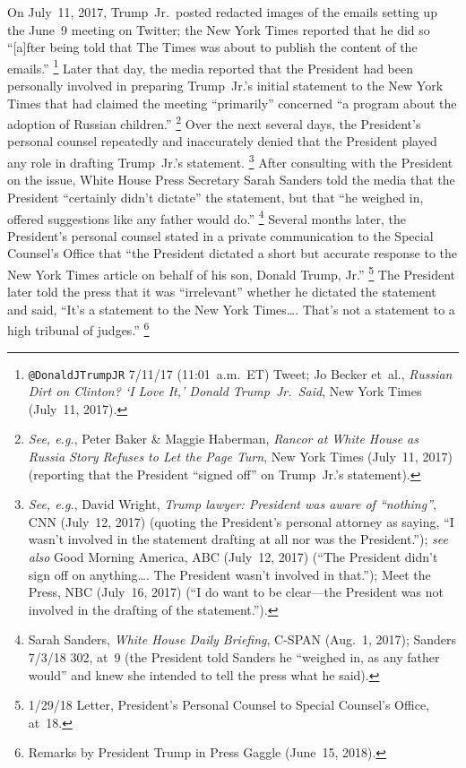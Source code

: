 On July~11, 2017, Trump~Jr.\ posted redacted images of the emails setting up the June~9 meeting on Twitter; the New York Times reported that he did so ``[a]fter being told that The Times was about to publish the content of the emails.''%
\footnote{\verb+@DonaldJTrumpJR+ 7/11/17 (11:01~a.m.~ET) Tweet;
Jo Becker et~al., \textit{Russian Dirt on Clinton? `I Love It,' Donald Trump~Jr.\ Said}, New York Times (July~11, 2017).}
Later that day, the media reported that the President had been personally involved in preparing Trump~Jr.'s initial statement to the New York Times that had claimed the meeting ``primarily'' concerned ``a program about the adoption of Russian children.''%
\footnote{\textit{See, e.g.}, Peter Baker \& Maggie Haberman, \textit{Rancor at White House as Russia Story Refuses to Let the Page Turn}, New York Times (July~11, 2017) (reporting that the President ``signed off\thinspace'' on Trump~Jr.'s statement).}
Over the next several days, the President's personal counsel repeatedly and inaccurately denied that the President played any role in drafting Trump~Jr.'s statement.%
\footnote{\textit{See, e.g.}, David Wright, \textit{Trump lawyer: President was aware of ``nothing''}, CNN (July~12, 2017) (quoting the President's personal attorney as saying, ``I wasn't involved in the statement drafting at all nor was the President.'');
\textit{see also} Good Morning America, ABC (July~12, 2017) (``The President didn't sign off on anything\dots. The President wasn't involved in that.'');
Meet the Press, NBC (July~16, 2017) (``I do want to be clear---the President was not involved in the drafting of the statement.'').}
After consulting with the President on the issue, White House Press Secretary Sarah Sanders told the media that the President ``certainly didn't dictate'' the statement, but that ``he weighed in, offered suggestions like any father would do.''%
\footnote{Sarah Sanders, \textit{White House Daily Briefing}, C-SPAN (Aug.~1, 2017);
Sanders 7/3/18 302, at~9 (the President told Sanders he ``weighed in, as any father would'' and knew she intended to tell the press what he said).}
Several months later, the President's personal counsel stated in a private communication to the Special Counsel's Office that ``the President dictated a short but accurate response to the New York Times article on behalf of his son, Donald Trump, Jr.''%
\footnote{1/29/18 Letter, President's Personal Counsel to Special Counsel's Office, at~18.}
The President later told the press that it was ``irrelevant'' whether he dictated the statement and said, ``It's a statement to the New York Times\dots. That's not a statement to a high tribunal of judges.''%
\footnote{Remarks by President Trump in Press Gaggle (June~15, 2018).}

